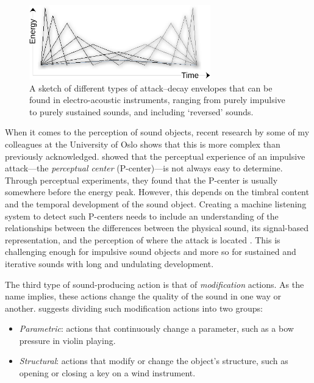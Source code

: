 \begin{figure}[tbp]
	\centering
      \includegraphics[width=0.7\textwidth]{figures/28-energy-time-crop.pdf}
\caption{A sketch of different types of attack--decay envelopes that can be found in electro-acoustic instruments, ranging from purely impulsive to purely sustained sounds, and including `reversed' sounds.}
\label{fig:impulsive-sustained}
\end{figure}

When it comes to the perception of sound objects, recent research by some of my colleagues at the University of Oslo shows that this is more complex than previously acknowledged. \citet{danielsen_where_2019} showed that the perceptual experience of an impulsive attack---the \emph{perceptual center} (P-center)---is not always easy to determine. Through perceptual experiments, they found that the P-center is usually somewhere before the energy peak. However, this depends on the timbral content and the temporal development of the sound object. Creating a machine listening system to detect such P-centers needs to include an understanding of the relationships between the differences between the physical sound, its signal-based representation, and the perception of where the attack is located \citep{lartillot_computational_2021}. This is challenging enough for impulsive sound objects and more so for sustained and iterative sounds with long and undulating development.

The third type of sound-producing action is that of \emph{modification} actions. As the name implies, these actions change the quality of the sound in one way or another. \citet{cadoz_instrumental_1988} suggests dividing such modification actions into two groups:

\begin{itemize}
\item \emph{Parametric}: actions that continuously change a parameter, such as a bow pressure in violin playing.
\item \emph{Structural}: actions that modify or change the object's structure, such as opening or closing a key on a wind instrument.
\end{itemize}

